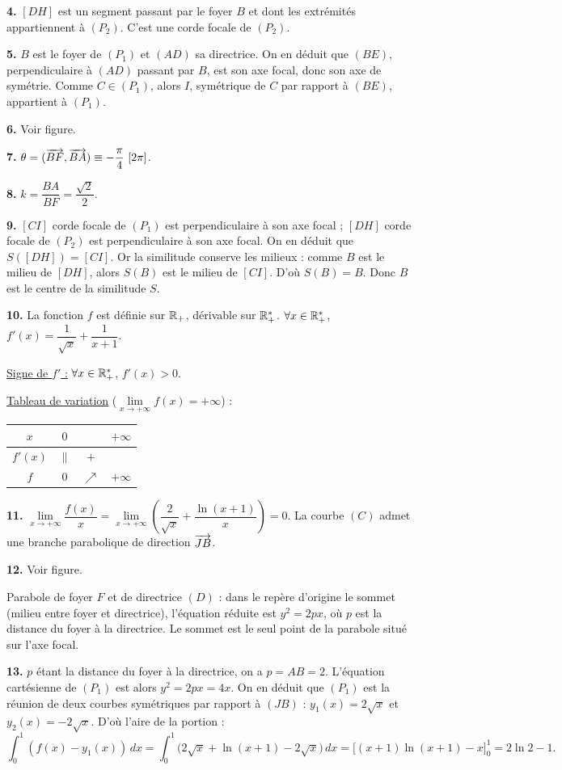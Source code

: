 \documentclass[11pt]{article}
\begin{document}
\textbf{4.} $[DH]$ est un segment passant par le foyer $B$ et dont les extrémités appartiennent à $(P_2)$. C'est une corde focale de $(P_2)$.

\textbf{5.} $B$ est le foyer de $(P_1)$ et $(AD)$ sa directrice. On en déduit que $(BE)$, perpendiculaire à $(AD)$ passant par $B$, est son axe focal, donc son axe de symétrie. Comme $C \in (P_1)$, alors $I$, symétrique de $C$ par rapport à $(BE)$, appartient à $(P_1)$.

\textbf{6.} Voir figure.

\textbf{7.} $\theta = (\overrightarrow{BF}, \overrightarrow{BA}) \equiv -\dfrac{\pi}{4}\ [2\pi]$.

\textbf{8.} $k = \dfrac{BA}{BF} = \dfrac{\sqrt{2}}{2}$.

\textbf{9.} $[CI]$ corde focale de $(P_1)$ est perpendiculaire à son axe focal ; $[DH]$ corde focale de $(P_2)$ est perpendiculaire à son axe focal. On en déduit que $S([DH]) = [CI]$. Or la similitude conserve les milieux : comme $B$ est le milieu de $[DH]$, alors $S(B)$ est le milieu de $[CI]$. D'où $S(B) = B$. Donc $B$ est le centre de la similitude $S$.

\textbf{10.} La fonction $f$ est définie sur $\mathbb{R}_+$, dérivable sur $\mathbb{R}_+^*$. $\forall x \in \mathbb{R}_+^*$, $f'(x) = \dfrac{1}{\sqrt{x}} + \dfrac{1}{x + 1}$.

\underline{Signe de $f'$ :} $\forall x \in \mathbb{R}_+^*$, $f'(x) > 0$.

\underline{Tableau de variation} ($\lim\limits_{x\to+\infty} f(x) = +\infty$) :
\begin{center}\renewcommand{\arraystretch}{1.4}
\begin{tabular}{|c|ccc|}
\hline
$x$ & $0$ & & $+\infty$ \\
\hline
$f'(x)$ & $\|$ & $+$ & \\
\hline
$f$ & $0$ & $\nearrow$ & $+\infty$ \\
\hline
\end{tabular}
\end{center}

\textbf{11.} $\lim\limits_{x\to+\infty}\dfrac{f(x)}{x} = \lim\limits_{x\to+\infty}\left(\dfrac{2}{\sqrt{x}} + \dfrac{\ln(x+1)}{x}\right) = 0$. La courbe $(C)$ admet une branche parabolique de direction $\overrightarrow{JB}$.

\textbf{12.} Voir figure.

\begin{rappel}
Parabole de foyer $F$ et de directrice $(D)$ : dans le repère d'origine
le sommet (milieu entre foyer et directrice), l'équation réduite est
$y^2 = 2px$, où $p$ est la distance du foyer à la directrice. Le sommet
est le seul point de la parabole situé sur l'axe focal.
\end{rappel}

\textbf{13.} $p$ étant la distance du foyer à la directrice, on a $p = AB = 2$. L'équation cartésienne de $(P_1)$ est alors $y^2 = 2px = 4x$. On en déduit que $(P_1)$ est la réunion de deux courbes symétriques par rapport à $(JB)$ : $y_1(x) = 2\sqrt{x}$ et $y_2(x) = -2\sqrt{x}$. D'où l'aire de la portion :
\[ \int_0^1 (f(x) - y_1(x))\,dx = \int_0^1 \big(2\sqrt{x} + \ln(x+1) - 2\sqrt{x}\big)\,dx = \big[(x+1)\ln(x+1) - x\big]_0^1 = 2\ln 2 - 1. \]
\end{document}
